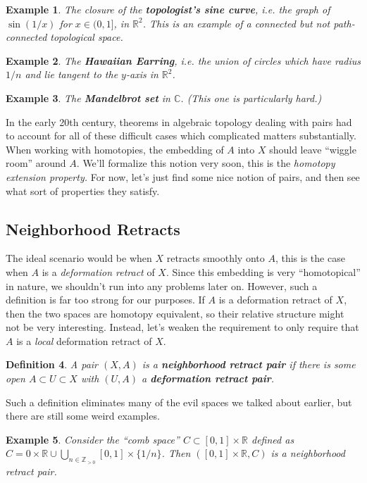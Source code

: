 \documentclass{article}
\providecommand{\R}{\mathbb{R}}
\providecommand{\C}{\mathbb{C}}
\providecommand{\Z}{\mathbb{Z}}
\newtheorem{definition}{Definition}[subsection]
\newtheorem{example}[definition]{Example}
\begin{document}
\begin{example}
  The closure of the \textbf{topologist's sine curve}, i.e. the graph of $\sin(1/x)$ for $x\in (0,1]$, in $\R^2$. This is an example of a connected but not path-connected topological space.
\end{example}

\begin{example}
  The \textbf{Hawaiian Earring}, i.e. the union of circles which have radius $1/n$ and lie tangent to the $y$-axis in $\R^2$.
\end{example}

\begin{example}
  The \textbf{Mandelbrot set} in $\C$. (This one is particularly hard.)
\end{example}

In the early 20th century, theorems in algebraic topology dealing with pairs had to account for all of these difficult cases which complicated matters substantially. When working with homotopies, the embedding of $A$ into $X$ should leave ``wiggle room'' around $A$. We'll formalize this notion very soon, this is the \emph{homotopy extension property.} For now, let's just find some nice notion of pairs, and then see what sort of properties they satisfy.

\subsection{Neighborhood Retracts}

The ideal scenario would be when $X$ retracts smoothly onto $A$, this is the case when $A$ is a \emph{deformation retract} of $X$. Since this embedding is very ``homotopical'' in nature, we shouldn't run into any problems later on. However, such a definition is far too strong for our purposes. If $A$ is a deformation retract of $X$, then the two spaces are homotopy equivalent, so their relative structure might not be very interesting. Instead, let's weaken the requirement to only require that $A$ is a \emph{local} deformation retract of $X$.

\begin{definition}
  A pair $(X, A)$ is a \textbf{neighborhood retract pair} if there is some open $A\subset U\subset X$ with $(U, A)$ a \textbf{deformation retract pair}.
\end{definition}

Such a definition eliminates many of the evil spaces we talked about earlier, but there are still some weird examples.
\begin{example}
  Consider the ``comb space'' $C\subset [0,1]\times \R$ defined as $C=0\times \R\cup\bigcup_{n\in \Z_{>0}} [0,1]\times \{1/n\}$. Then $([0,1]\times \R, C)$ is a neighborhood retract pair.
\end{example}
\end{document}
